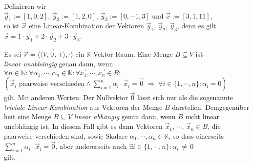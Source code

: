 \example
Definieren wir
\\[0.2cm]
\hspace*{1.3cm}
$\vec{y}_1 := [1, 0, 2]$, \quad  $\vec{y}_2 := [1, 2, 0]$, \quad  $\vec{y}_3 := [0, -1, 3]$  \quad und \quad  $\vec{x} := [3, 1, 11]$,
\\[0.2cm]
so ist $\vec{x}$ eine Linear-Kombination der Vektoren $\vec{y}_1$, $\vec{y}_2$, $\vec{y}_3$, denn es gilt
\\[0.2cm]
\hspace*{1.3cm}
$\vec{x} = 1 \cdot \vec{y}_1 + 2 \cdot \vec{y}_2 + 3 \cdot \vec{y}_3$.  \eoxs

\begin{Definition}
Es sei $\mathcal{V} = \bigl\langle \langle V, \vec{0}, + \rangle, \cdot \bigr\rangle$ ein $\mathbb{K}$-Vektor-Raum.  
Eine Menge $B \subseteq V$ ist \\ \emph{linear unabh\"{a}ngig} genau dann, wenn 
\\[0.2cm]
\hspace*{1.3cm}
$\forall n \in \mathbb{N}:\forall \alpha_1, \cdots, \alpha_n \in \mathbb{K}: \forall \vec{x_1}, \cdots,
\vec{x_n} \in B:$ \\
\hspace*{2.3cm} $\left(
 \mbox{$\vec{x}_i$ paarweise verschieden} \wedge \sum\limits_{i=1}^n \alpha_i \cdot \vec{x}_i = \vec{0} \;\Rightarrow\; \forall i \in
 \{1,\cdots,n\}: \alpha_i = 0\right)
$
\\[0.2cm]
gilt.  Mit anderen Worten:  Der Nullvektor $\vec{0}$ l\"{a}sst sich nur als die sogenannte
\emph{triviale Linear-Kombination} aus Vektoren der Menge $B$ darstellen.  Demgegen\"{u}ber hei\3t eine
Menge $B \subseteq V$ \emph{linear abh\"{a}ngig} genau dann, wenn $B$ nicht linear unabh\"{a}ngig ist.  In
diesem Fall gibt es dann Vektoren $\vec{x}_1$, $\cdots$, $\vec{x}_n \in B$, die paarweise
verschieden sind, sowie Skalare $\alpha_1,\cdots,\alpha_n \in \mathbb{K}$, so dass einerseits
\\[0.2cm]
\hspace*{1.3cm}
$\sum\limits_{i=1}^n \alpha_i \cdot \vec{x}_i = \vec{0}$, \quad aber andererseits auch \quad
$\exists i \in \{1,\cdots,n\}: \alpha_i \,\not=\, 0$
\\[0.2cm]
gilt.  
\eoxs
\end{Definition}

